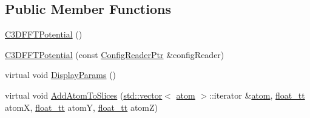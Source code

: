 \subsection*{Public Member Functions}
\begin{DoxyCompactItemize}
\item 
\hyperlink{class_q_s_t_e_m_1_1_c3_d_f_f_t_potential_a6d20588f42422671d3e565fcbd9c7696}{C3\-D\-F\-F\-T\-Potential} ()
\item 
\hyperlink{class_q_s_t_e_m_1_1_c3_d_f_f_t_potential_a0a13e03b10cc239a52598dc8948ff16a}{C3\-D\-F\-F\-T\-Potential} (const \hyperlink{namespace_q_s_t_e_m_af9424707fe9f6503298f49b41304bd35}{Config\-Reader\-Ptr} \&config\-Reader)
\item 
virtual void \hyperlink{class_q_s_t_e_m_1_1_c3_d_f_f_t_potential_a08ed3aed7622f2e1ff44206280c09659}{Display\-Params} ()
\item 
virtual void \hyperlink{class_q_s_t_e_m_1_1_c3_d_f_f_t_potential_ae123c91e40c74b33f812b85796a690b1}{Add\-Atom\-To\-Slices} (\hyperlink{qmb_8m_af54b69a32590de218622e869b06b47b3}{std\-::vector}$<$ \hyperlink{namespace_q_s_t_e_m_a402dabc31a7a1fe906d0cdd138c69686}{atom} $>$\-::iterator \&\hyperlink{namespace_q_s_t_e_m_a402dabc31a7a1fe906d0cdd138c69686}{atom}, \hyperlink{namespace_q_s_t_e_m_a915d7caa497280d9f927c4ce8d330e47}{float\-\_\-tt} atom\-X, \hyperlink{namespace_q_s_t_e_m_a915d7caa497280d9f927c4ce8d330e47}{float\-\_\-tt} atom\-Y, \hyperlink{namespace_q_s_t_e_m_a915d7caa497280d9f927c4ce8d330e47}{float\-\_\-tt} atom\-Z)
\end{DoxyCompactItemize}
